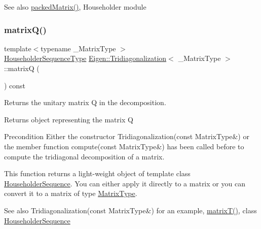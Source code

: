 \begin{DoxySeeAlso}{See also}
\mbox{\hyperlink{class_eigen_1_1_tridiagonalization_a47858b3895e64acafb1bb2e97f98a154}{packed\+Matrix()}}, Householder module 
\end{DoxySeeAlso}
\mbox{\label{class_eigen_1_1_tridiagonalization_a000f7392eda930576ffd2af1fae54af2}} 
\subsubsection{\texorpdfstring{matrixQ()}{matrixQ()}}
{\footnotesize\ttfamily template$<$typename \+\_\+\+Matrix\+Type $>$ \\
\mbox{\hyperlink{class_eigen_1_1_tridiagonalization_af322315c8bea9990152c9d09bfa2a69f}{Householder\+Sequence\+Type}} \mbox{\hyperlink{class_eigen_1_1_tridiagonalization}{Eigen\+::\+Tridiagonalization}}$<$ \+\_\+\+Matrix\+Type $>$\+::matrixQ (\begin{DoxyParamCaption}{ }\end{DoxyParamCaption}) const\hspace{0.3cm}{\ttfamily [inline]}}



Returns the unitary matrix Q in the decomposition. 

\begin{DoxyReturn}{Returns}
object representing the matrix Q
\end{DoxyReturn}
\begin{DoxyPrecond}{Precondition}
Either the constructor Tridiagonalization(const Matrix\+Type\&) or the member function compute(const Matrix\+Type\&) has been called before to compute the tridiagonal decomposition of a matrix.
\end{DoxyPrecond}
This function returns a light-\/weight object of template class \mbox{\hyperlink{class_eigen_1_1_householder_sequence}{Householder\+Sequence}}. You can either apply it directly to a matrix or you can convert it to a matrix of type \mbox{\hyperlink{class_eigen_1_1_tridiagonalization_add0f4b2216d0ea8ee0f7d8525deaf0a9}{Matrix\+Type}}.

\begin{DoxySeeAlso}{See also}
Tridiagonalization(const Matrix\+Type\&) for an example, \mbox{\hyperlink{class_eigen_1_1_tridiagonalization_a6eb5ef94b8b9bb013c0e69b6df56d0df}{matrix\+T()}}, class \mbox{\hyperlink{class_eigen_1_1_householder_sequence}{Householder\+Sequence}} 
\end{DoxySeeAlso}
\mbox{\label{class_eigen_1_1_tridiagonalization_a6eb5ef94b8b9bb013c0e69b6df56d0df}} 
